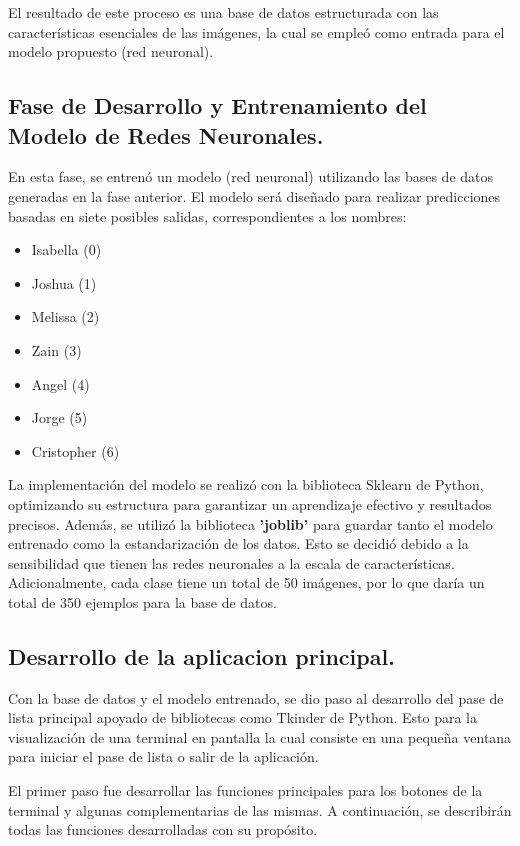 \documentclass[12pt, letterpaper]{article}
\begin{document}
El resultado de este proceso es una base de datos estructurada con las características esenciales de las imágenes, la cual se empleó como entrada para el modelo propuesto (red neuronal).

\subsection{Fase de Desarrollo y Entrenamiento del Modelo de Redes Neuronales.}
En esta fase, se entrenó un modelo (red neuronal) utilizando las bases de datos generadas en la fase anterior. El modelo será diseñado para realizar predicciones basadas en siete posibles salidas, correspondientes a los nombres:
\begin{itemize}
    \item Isabella (0)
    \item Joshua (1)
    \item Melissa (2)
    \item Zain (3)
    \item Angel (4)
    \item Jorge (5)
    \item Cristopher (6) 
\end{itemize}
La implementación del modelo se realizó con la biblioteca Sklearn de Python, optimizando su estructura para garantizar un aprendizaje efectivo y resultados precisos. Además, se utilizó la biblioteca \textbf{'joblib'} para guardar tanto el modelo entrenado como la estandarización de los datos. Esto se decidió debido a la sensibilidad que tienen las redes neuronales a la escala de características. Adicionalmente, cada clase tiene un total de 50 imágenes, por lo que daría un total de 350 ejemplos para la base de datos.\par


\subsection{Desarrollo de la aplicacion principal.}
Con la base de datos y el modelo entrenado, se dio paso al desarrollo del pase de lista principal apoyado de bibliotecas como Tkinder de Python. Esto para la visualización de una terminal en pantalla la cual consiste en una pequeña ventana para iniciar el pase de lista o salir de la aplicación.\par
El primer paso fue desarrollar las funciones principales para los botones de la terminal y algunas complementarias de las mismas. A continuación, se describirán todas las funciones desarrolladas con su propósito.\par 
\end{document}
